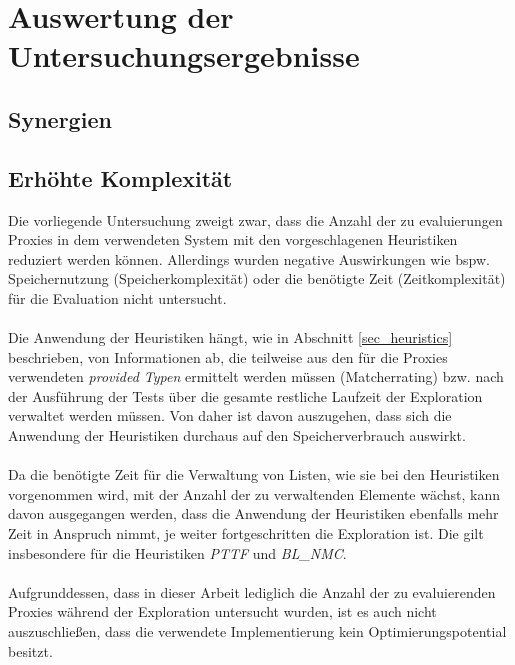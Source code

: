 \section{Auswertung der Untersuchungsergebnisse}
\subsection{Synergien}
\subsection{Erhöhte Komplexität}
Die vorliegende Untersuchung zweigt zwar, dass die Anzahl der zu evaluierungen Proxies in dem verwendeten System mit den vorgeschlagenen Heuristiken reduziert werden können. Allerdings wurden negative Auswirkungen wie bspw. Speichernutzung (Speicherkomplexität) oder die benötigte Zeit  (Zeitkomplexität) für die Evaluation nicht untersucht.
\\\\
Die Anwendung der Heuristiken hängt, wie in Abschnitt \ref{sec_heuristics} beschrieben, von Informationen ab, die teilweise aus den für die Proxies verwendeten \emph{provided Typen} ermittelt werden müssen (Matcherrating) bzw. nach der Ausführung der Tests über die gesamte restliche Laufzeit der Exploration verwaltet werden müssen. Von daher ist davon auszugehen, dass sich die Anwendung der Heuristiken durchaus auf den Speicherverbrauch auswirkt.
\\\\
Da die benötigte Zeit für die Verwaltung von Listen, wie sie bei den Heuristiken vorgenommen wird, mit der Anzahl der zu verwaltenden Elemente wächst, kann davon ausgegangen werden, dass die Anwendung der Heuristiken ebenfalls mehr Zeit in Anspruch nimmt, je weiter fortgeschritten die Exploration ist. Die gilt insbesondere für die Heuristiken \emph{PTTF} und \emph{BL\_NMC}. 
\\\\
Aufgrunddessen, dass in dieser Arbeit lediglich die Anzahl der zu evaluierenden Proxies während der Exploration untersucht wurden, ist es auch nicht auszuschließen, dass die verwendete Implementierung kein Optimierungspotential besitzt.


